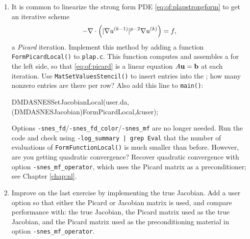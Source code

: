 \begin{enumerate}
\item It is common to linearize the strong form PDE \eqref{eq:of:plapstrongform} to get an iterative scheme
\begin{equation}
- \nabla\cdot\left(|\nabla u^{(k-1)}|^{p-2} \nabla u^{(k)}\right) = f,
\label{eq:of:picard}
\end{equation}
a \emph{Picard} iteration.  Implement this method by adding a function \texttt{FormPicardLocal()} to \texttt{plap.c}.  This function computes and assembles a \pMat for the left side, so that \eqref{eq:of:picard} is a linear equation $A\mathbf{u} = \mathbf{b}$ at each iteration.  Use \texttt{MatSetValuesStencil()} to insert entries into the \pMat; how many nonzero entries are there per row?  Also add this line to \texttt{main()}:
\begin{code}
    DMDASNESSetJacobianLocal(user.da,
            (DMDASNESJacobian)FormPicardLocal,&user);
\end{code}
Options \texttt{-snes\_fd}/\texttt{-snes\_fd\_color}/\texttt{-snes\_mf} are no longer needed.  Run the code and check using \texttt{-log\_summary | grep Eval} that the number of evaluations of \texttt{FormFunctionLocal()} is much smaller than before.  However, are you getting quadratic convergence?  Recover quadratic convergence with option \texttt{-snes\_mf\_operator}, which uses the Picard matrix as a preconditioner; see Chapter \ref{chap:nl}.

\item Improve on the last exercise by implementing the true Jacobian.  Add a user option so that either the Picard or Jacobian matrix is used, and compare performance with: the true Jacobian, the Picard matrix used as the true Jacobian, and the Picard matrix used as the preconditioning material in option \texttt{-snes\_mf\_operator}. 

\end{enumerate}

